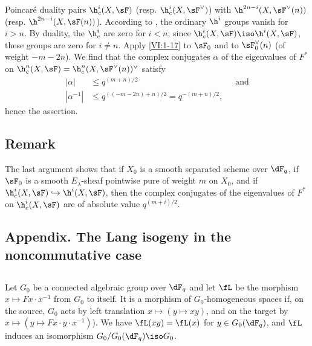 Poincaré duality pairs $\h_c^i(X,\sF)$ (resp. 
$\h_c^i(X,\sF^\vee)$) with $\h^{2n-i}(X,\sF^\vee(n))$ (resp. 
$\h^{2n-i}(X,\sF(n))$). According to \cite[XIV 3.2]{sga4}, the ordinary $\h^i$ groups 
vanish for $i>n$. By duality, the $\h_c^i$ are zero for $i<n$; since 
$\h_c^i(X,\sF) \iso \h^i(X,\sF)$, these groups are zero for $i\ne n$. 
Apply \ref{VI:1-17} to $\sF_0$ and to $\sF_0^\vee(n)$ (of weight 
$-m-2n$). We find that the complex conjugates $\alpha$ of the eigenvalues 
of $F^\ast$ on $\h_c^n(X,\sF) = \h_c^n(X,\sF^\vee(n))^\vee$ satisfy 
\begin{align*}
  |\alpha| &\leqslant q^{(m+n)/2} && \text{and} \\
  |\alpha^{-1}| &\leqslant q^{((-m-2n)+n)/2} = q^{-(m+n)/2} \text{,}
\end{align*}
hence the assertion. 





\subsection{Remark}\label{VI:1-21}

The last argument shows that if $X_0$ is a smooth separated scheme over 
$\dF_q$, if $\sF_0$ is a smooth $E_\lambda$-sheaf pointwise pure of weight 
$m$ on $X_0$, and if $\h_c^i(X,\sF) \hookrightarrow \h^i(X,\sF)$, then the 
complex conjugates of the eigenvalues of $F^\ast$ on $\h_c^i(X,\sF)$ are 
of absolute value $q^{(m+i)/2}$. 





\subsection*{Appendix. The Lang isogeny in the noncommutative case}




\subsection{}\label{VI:1-22}

Let $G_0$ be a connected algebraic group over $\dF_q$ and let $\fL$ be the morphism 
$x\mapsto F x\cdot x^{-1}$ from $G_0$ to itself. It is a morphism of 
$G_0$-homogeneous spaces if, on the source, $G_0$ acts by left translation 
$x\mapsto (y\mapsto x y)$, and on the target by 
$x\mapsto (y\mapsto F x\cdot y\cdot x^{-1})$). We have $\fL(xy) = \fL(x)$ for 
$y\in G_0(\dF_q)$, and $\fL$ induces an isomorphism $G_0/G_0(\dF_q)\iso G_0$. 

